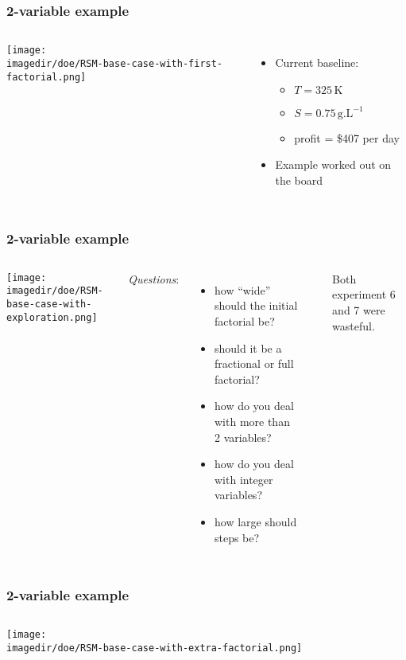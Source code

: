 \begin{frame}\frametitle{2-variable example}
	\begin{columns}
		\column{6cm}
			\begin{center}
				\texttt{[image: \\imagedir/doe/RSM-base-case-with-first-factorial.png]}
			\end{center}
		\column{4cm}
			\begin{itemize}
				\item	Current baseline:
				\begin{itemize}
					\item	$T = 325\,\text{K}$
					\item	$S = 0.75\,\text{g.L}^{-1}$
					\item	profit = \$407 per day
				\end{itemize}
				\item	Example worked out on the board
			\end{itemize}
	\end{columns}
\end{frame}

\begin{frame}\frametitle{2-variable example}
	\begin{columns}
		\column{0.60\textwidth}
			\begin{center}
				\texttt{[image: \\imagedir/doe/RSM-base-case-with-exploration.png]}
			\end{center}
		\column{0.50\textwidth}
			\vspace{12pt}
			\emph{Questions}:
			\begin{itemize}
				\item	how ``wide'' should the initial factorial be?
				\item	should it be a fractional or full factorial?
				\item	how do you deal with more than 2 variables?
				\item	how do you deal with integer variables?
				\item	how large should steps be?
			\end{itemize}
			\vspace{6pt}
			\hrule
			\vspace{12pt}
			Both experiment 6 and 7 were wasteful.
	\end{columns}
\end{frame}

\begin{frame}\frametitle{2-variable example}
	\begin{columns}
			\begin{center}
				\texttt{[image: \\imagedir/doe/RSM-base-case-with-extra-factorial.png]}
			\end{center}
	 	\column{0.4\textwidth}
	\end{columns}
\end{frame}

